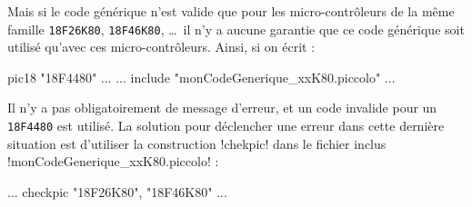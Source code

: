 Mais si le code générique n'est valide que pour les micro-contrôleurs de la même famille \texttt{18F26K80}, \texttt{18F46K80}, \dots\ il n'y a aucune garantie que ce code générique soit utilisé qu'avec ces micro-contrôleurs. Ainsi, si on écrit :

\begin{piccolo}
pic18 "18F4480" ...
  ...
include "monCodeGenerique_xxK80.piccolo"
  ...
\end{piccolo}

Il n'y a pas obligatoirement de message d'erreur, et un code invalide pour un \texttt{18F4480} est utilisé. La solution pour déclencher une erreur dans cette dernière situation est d'utiliser la construction \pic!chekpic! dans le fichier inclus \pic!monCodeGenerique_xxK80.piccolo! :

\begin{piccolo}
  ...
checkpic "18F26K80", "18F46K80"
  ...
\end{piccolo}


 